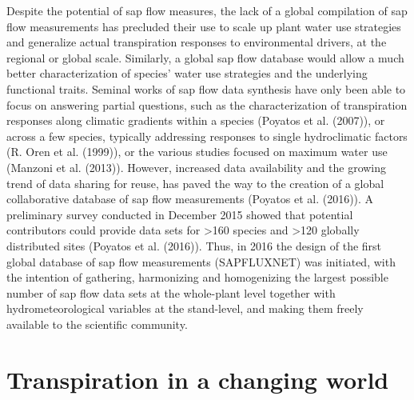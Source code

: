 \documentclass[11pt,twoside]{reedthesis}
\begin{document}
Despite the potential of sap flow measures, the lack of a global
compilation of sap flow measurements has precluded their use to scale up
plant water use strategies and generalize actual transpiration responses
to environmental drivers, at the regional or global scale. Similarly, a
global sap flow database would allow a much better characterization of
species' water use strategies and the underlying functional traits.
Seminal works of sap flow data synthesis have only been able to focus on
answering partial questions, such as the characterization of
transpiration responses along climatic gradients within a species
(Poyatos et al. (2007)), or across a few species, typically addressing
responses to single hydroclimatic factors (R. Oren et al. (1999)), or
the various studies focused on maximum water use (Manzoni et al.
(2013)). However, increased data availability and the growing trend of
data sharing for reuse, has paved the way to the creation of a global
collaborative database of sap flow measurements (Poyatos et al. (2016)).
A preliminary survey conducted in December 2015 showed that potential
contributors could provide data sets for \textgreater{}160 species and
\textgreater{}120 globally distributed sites (Poyatos et al. (2016)).
Thus, in 2016 the design of the first global database of sap flow
measurements (SAPFLUXNET) was initiated, with the intention of
gathering, harmonizing and homogenizing the largest possible number of
sap flow data sets at the whole-plant level together with
hydrometeorological variables at the stand-level, and making them freely
available to the scientific community.\par

\section{Transpiration in a changing
world}\label{transpiration-in-a-changing-world}
\end{document}
